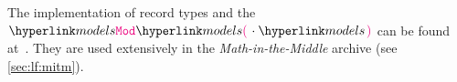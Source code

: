 The implementation of record types and the $\modelsof\cdot$ can be found at~\cite{mmtlfx:git}. They are used extensively in the \emph{Math-in-the-Middle} archive (see \autoref{sec:lf:mitm}).



